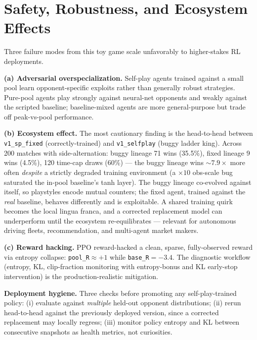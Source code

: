 \section{Safety, Robustness, and Ecosystem Effects}
\label{sec:safety}

Three failure modes from this toy game scale unfavorably to higher-stakes
RL deployments.

\textbf{(a) Adversarial overspecialization.} Self-play agents trained
against a small pool learn opponent-specific exploits rather than
generally robust strategies. Pure-pool agents play strongly against
neural-net opponents and weakly against the scripted baseline;
baseline-mixed agents are more general-purpose but trade off peak-vs-pool
performance.

\textbf{(b) Ecosystem effect.} The most cautionary finding is the
head-to-head between \texttt{v1\_sp\_fixed} (correctly-trained) and
\texttt{v1\_selfplay} (buggy ladder king). Across 200 matches with
side-alternation: buggy lineage 71 wins (35.5\%), fixed lineage 9 wins
(4.5\%), 120 time-cap draws (60\%) --- the buggy lineage wins
$\sim 7.9\times$ more often \emph{despite} a strictly degraded training
environment (a $\times 10$ obs-scale bug saturated the in-pool baseline's
tanh layer). The buggy lineage co-evolved against itself, so playstyles
encode mutual counters; the fixed agent, trained against the
\emph{real} baseline, behaves differently and is exploitable. A shared
training quirk becomes the local lingua franca, and a corrected
replacement model can underperform until the ecosystem
re-equilibrates --- relevant for autonomous driving fleets,
recommendation, and multi-agent market makers.

\textbf{(c) Reward hacking.} PPO reward-hacked a clean, sparse,
fully-observed reward via entropy collapse: \texttt{pool\_R}$\approx +1$
while \texttt{base\_R}$=-3.4$. The diagnostic workflow (entropy, KL,
clip-fraction monitoring with entropy-bonus and KL early-stop
intervention) is the production-realistic mitigation.

\textbf{Deployment hygiene.} Three checks before promoting any
self-play-trained policy: (i) evaluate against \emph{multiple} held-out
opponent distributions; (ii) rerun head-to-head against the previously
deployed version, since a corrected replacement may locally regress;
(iii) monitor policy entropy and KL between consecutive snapshots as
health metrics, not curiosities.
